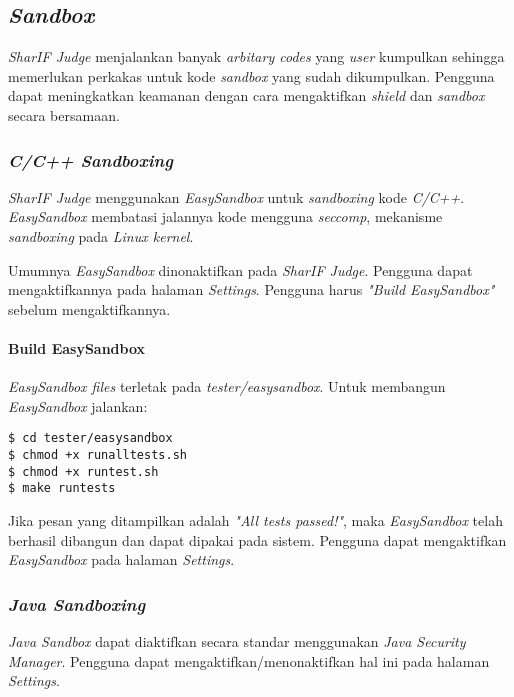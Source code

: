 \subsection{\textit{Sandbox}}
\label{subsec:sandbox}
\textit{SharIF Judge} menjalankan banyak \textit{arbitary codes} yang \textit{user} kumpulkan sehingga memerlukan perkakas untuk kode \textit{sandbox} yang sudah dikumpulkan. Pengguna dapat meningkatkan keamanan dengan cara mengaktifkan \textit{shield} dan \textit{sandbox} secara bersamaan.

\subsubsection{\textit{C/C++ Sandboxing}}
\label{subsubsec:sandbox_c/c++}
\textit{SharIF Judge} menggunakan \textit{EasySandbox} untuk \textit{sandboxing} kode \textit{C/C++}. \textit{EasySandbox} membatasi jalannya kode mengguna \textit{seccomp}, mekanisme \textit{sandboxing} pada \textit{Linux kernel}.

Umumnya \textit{EasySandbox} dinonaktifkan pada \textit{SharIF Judge}. Pengguna dapat mengaktifkannya pada halaman \textit{Settings}. Pengguna harus \textit{"Build EasySandbox"} sebelum mengaktifkannya.

\paragraph{Build EasySandbox}
\textit{EasySandbox files} terletak pada \textit{tester/easysandbox}. Untuk membangun \textit{EasySandbox} jalankan:

\begin{lstlisting}[basicstyle=\ttfamily, frame=single,
columns=fullflexible, keepspaces=true, breaklines=true, label=ls:18]
$ cd tester/easysandbox
$ chmod +x runalltests.sh
$ chmod +x runtest.sh
$ make runtests
\end{lstlisting}

Jika pesan yang ditampilkan adalah \textit{"All tests passed!"}, maka \textit{EasySandbox} telah berhasil dibangun dan dapat dipakai pada sistem. Pengguna dapat mengaktifkan \textit{EasySandbox} pada halaman \textit{Settings}.

\subsubsection{\textit{Java Sandboxing}}
\label{subsubsec:java_sandbox}
\textit{Java Sandbox} dapat diaktifkan secara standar menggunakan \textit{Java Security Manager}. Pengguna dapat mengaktifkan/menonaktifkan hal ini pada halaman \textit{Settings}.

